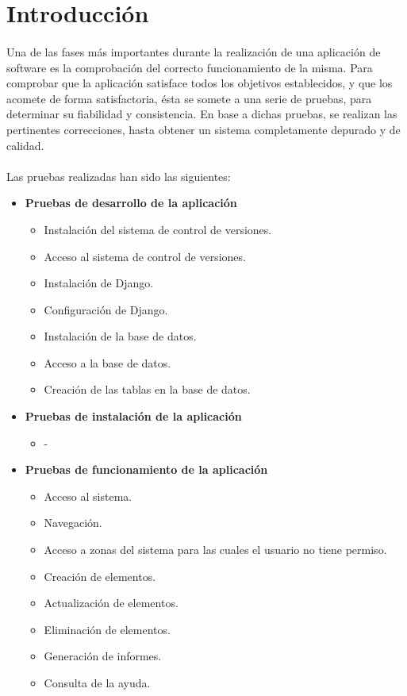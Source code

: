 \section{Introducción}

  \paragraph{}Una de las fases más importantes durante la realización de una
  aplicación de software es la comprobación del correcto funcionamiento de la
  misma. Para comprobar que la aplicación satisface todos los objetivos
  establecidos, y que los acomete de forma satisfactoria, ésta se somete a una
  serie de pruebas, para determinar su fiabilidad y consistencia. En base a
  dichas pruebas, se realizan las pertinentes correcciones, hasta obtener un
  sistema completamente depurado y de calidad.

 \paragraph{}Las pruebas realizadas han sido las siguientes:

 \begin{itemize}

  \item \textbf{Pruebas de desarrollo de la aplicación}
  \begin{itemize}
   \item Instalación del sistema de control de versiones.
   \item Acceso al sistema de control de versiones.
   \item Instalación de Django.
   \item Configuración de Django.
   \item Instalación de la base de datos.
   \item Acceso a la base de datos.
   \item Creación de las tablas en la base de datos.
  \end{itemize}

  \item \textbf{Pruebas de instalación de la aplicación}
  \begin{itemize}
   \item -
  \end{itemize}

  \item \textbf{Pruebas de funcionamiento de la aplicación}
  \begin{itemize}
   \item Acceso al sistema.
   \item Navegación.
   \item Acceso a zonas del sistema para las cuales el usuario no tiene permiso.
   \item Creación de elementos.
   \item Actualización de elementos.
   \item Eliminación de elementos.
   \item Generación de informes.
   \item Consulta de la ayuda.
  \end{itemize}

 \end{itemize}
